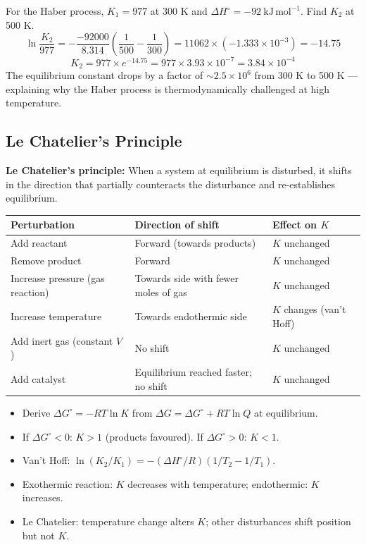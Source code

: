\documentclass[12pt,a4paper]{article}
\begin{document}
\begin{tcolorbox}[examplebox, title={Solved Example: Van't Hoff Equation}]
For the Haber process, $K_1 = 977$ at 300 K and $\Delta H^\circ = -92\ \mathrm{kJ\,mol^{-1}}$. Find $K_2$ at 500 K.
\[
\ln\frac{K_2}{977} = -\frac{-92000}{8.314}\!\left(\frac{1}{500}-\frac{1}{300}\right) = 11062\times(-1.333\times10^{-3}) = -14.75
\]
\[
K_2 = 977\times e^{-14.75} = 977\times3.93\times10^{-7} = 3.84\times10^{-4}
\]
The equilibrium constant drops by a factor of $\sim 2.5\times10^6$ from 300 K to 500 K --- explaining why the Haber process is thermodynamically challenged at high temperature.
\end{tcolorbox}

\subsection{Le Chatelier's Principle}
\begin{tcolorbox}[defbox]
\textbf{Le Chatelier's principle:} When a system at equilibrium is disturbed, it shifts in the direction that partially counteracts the disturbance and re-establishes equilibrium.
\end{tcolorbox}

\begin{tabularx}{\linewidth}{|B{2.6cm}|Y|Y|}
\hline
\textbf{Perturbation} & \textbf{Direction of shift} & \textbf{Effect on $K$} \\
\hline
Add reactant & Forward (towards products) & $K$ unchanged \\
\hline
Remove product & Forward & $K$ unchanged \\
\hline
Increase pressure (gas reaction) & Towards side with fewer moles of gas & $K$ unchanged \\
\hline
Increase temperature & Towards endothermic side & $K$ changes (van't Hoff) \\
\hline
Add inert gas (constant $V$) & No shift & $K$ unchanged \\
\hline
Add catalyst & Equilibrium reached faster; no shift & $K$ unchanged \\
\hline
\end{tabularx}

\begin{tcolorbox}[exambox, title={Exam Points (Section 3)}]
\begin{itemize}[leftmargin=*, itemsep=2pt, topsep=2pt]
  \item Derive $\Delta G^\circ = -RT\ln K$ from $\Delta G = \Delta G^\circ + RT\ln Q$ at equilibrium.
  \item If $\Delta G^\circ < 0$: $K > 1$ (products favoured). If $\Delta G^\circ > 0$: $K < 1$.
  \item Van't Hoff: $\ln(K_2/K_1) = -(\Delta H^\circ/R)(1/T_2 - 1/T_1)$.
  \item Exothermic reaction: $K$ decreases with temperature; endothermic: $K$ increases.
  \item Le Chatelier: temperature change alters $K$; other disturbances shift position but not $K$.
\end{itemize}
\end{tcolorbox}
\end{document}
